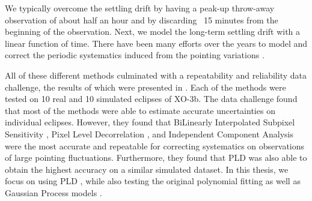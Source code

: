 We typically overcome the settling drift by having a peak-up throw-away observation of about half an hour and by discarding ~15 minutes from the beginning of the observation. Next, we model the long-term settling drift with a linear function of time. There have been many efforts over the years to model and correct the periodic systematics induced from the pointing variations \citep[e.g.,][]{Charbonneau2008,Ballard2010, Knutson2012,Stevenson2012, Evans2015, Morello2015a, Morello2015b, Buzasi2015, Deming2015, Krick2016}.

All of these different methods culminated with a repeatability and reliability data challenge, the results of which were presented in \citet{Ingalls2016}. Each of the methods were tested on 10 real and 10 simulated eclipses of XO-3b. The data challenge found that most of the methods were able to estimate accurate uncertainties on individual eclipses. However, they found that BiLinearly Interpolated Subpixel Sensitivity \citep[BLISS;][]{Stevenson2012}, Pixel Level Decorrelation \citep[PLD;][]{Deming2015}, and Independent Component Analysis \citep[ICA;][]{Morello2015a, Morello2015b} were the most accurate and repeatable for correcting systematics on observations of large pointing fluctuations. Furthermore, they found that PLD was also able to obtain the highest accuracy on a similar simulated dataset. In this thesis, we focus on using PLD \citep{Deming2015}, while also testing the original polynomial fitting \citep{Charbonneau2008} as well as Gaussian Process models \citep[GP;][]{Evans2015}.

